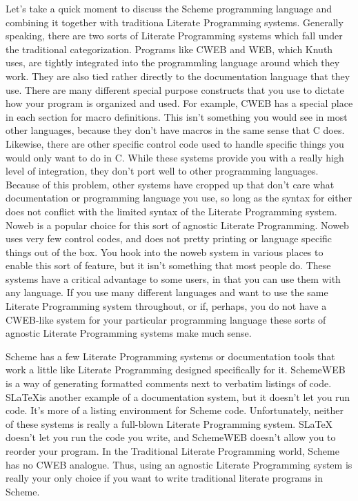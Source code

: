 %
Let's take a quick moment to discuss the Scheme programming language
and combining it together with traditiona Literate Programming
systems.  Generally speaking, there are two sorts of Literate
Programming systems which fall under the traditional categorization.
Programs like CWEB and WEB, which Knuth uses, are tightly integrated
into the programmling language around which they work.  They are also
tied rather directly to the documentation language that they use.
There are many different special purpose constructs that you use to
dictate how your program is organized and used.  For example, CWEB has
a special place in each section for macro definitions.  This isn't
something you would see in most other languages, because they don't
have macros in the same sense that C does.  Likewise, there are other
specific control code used to handle specific things you would only
want to do in C. While these systems provide you with a really high
level of integration, they don't port well to other programming
languages.  Because of this problem, other systems have cropped up
that don't care what documentation or programming language you use, so
long as the syntax for either does not conflict with the limited
syntax of the Literate Programming system.  Noweb is a popular choice
for this sort of agnostic Literate Programming.  Noweb uses very few
control codes, and does not pretty printing or language specific
things out of the box.  You hook into the noweb system in various
places to enable this sort of feature, but it isn't something that
most people do.  These systems have a critical advantage to some
users, in that you can use them with any language.  If you use many
different languages and want to use the same Literate Programming
system throughout, or if, perhaps, you do not have a CWEB-like system
for your particular programming language these sorts of agnostic
Literate Programming systems make much sense.

Scheme has a few Literate Programming systems or documentation tools
that work a little like Literate Programming designed specifically for
it.  SchemeWEB is a way of generating formatted comments next to
verbatim listings of code.  S\LaTeX is another example of a
documentation system, but it doesn't let you run code.  It's more of a
listing environment for Scheme code.  Unfortunately, neither of these
systems is really a full-blown Literate Programming system.  SLaTeX
doesn't let you run the code you write, and SchemeWEB doesn't allow
you to reorder your program.  In the Traditional Literate Programming
world, Scheme has no CWEB analogue.  Thus, using an agnostic Literate
Programming system is really your only choice if you want to write
traditional literate programs in Scheme.


